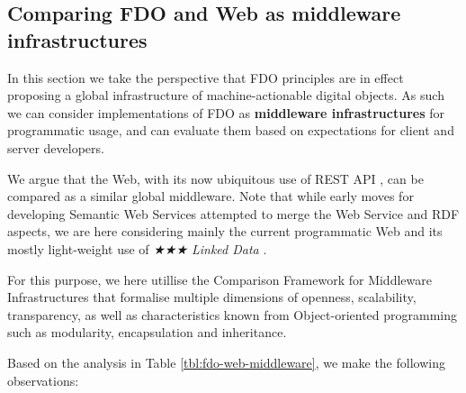 \documentclass[fleqn,10pt,lineno]{wlpeerjlua}
\begin{document}
\hypertarget{sec:middleware}{%
\subsection*{Comparing FDO and Web as middleware infrastructures}\label{sec:middleware}}

In this section we take the perspective that FDO principles are in effect proposing a global infrastructure of machine-actionable digital objects. As such we can consider implementations of FDO as \textbf{middleware infrastructures} for programmatic usage, and can evaluate them based on expectations for client and server developers.

We argue that the Web, with its now ubiquitous use of REST API \cite{174AwcFUL}, can be compared as a similar global middleware. Note that while early moves for developing Semantic Web Services \cite{WzPECPDP} attempted to merge the Web Service and RDF aspects, we are here considering mainly the current programmatic Web and its mostly light-weight use of \emph{★★★ Linked Data} \cite{11dInoyVF}.

For this purpose, we here utillise the Comparison Framework for Middleware Infrastructures \cite{hRzcHhPD} that formalise multiple dimensions of openness, scalability, transparency, as well as characteristics known from Object-oriented programming such as modularity, encapsulation and inheritance.




Based on the analysis in Table \ref{tbl:fdo-web-middleware}, we make the following observations:
\end{document}
